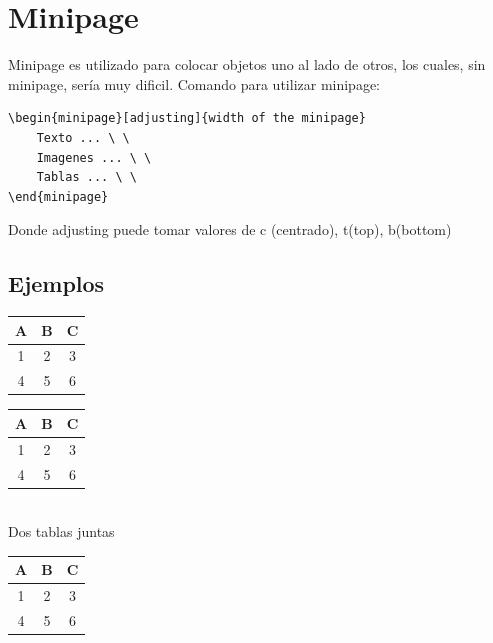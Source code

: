 \documentclass[10pt,journal,compsoc]{IEEEtran}
\begin{document}
\section{Minipage}%
Minipage es utilizado para colocar objetos uno al lado de otros, los cuales, sin minipage, ser\'ia muy dificil.
Comando para utilizar minipage:
\begin{lstlisting}
\begin{minipage}[adjusting]{width of the minipage}
    Texto ... \ \
    Imagenes ... \ \
    Tablas ... \ \
\end{minipage}
\end{lstlisting}
	Donde adjusting puede tomar valores de c (centrado), t(top), b(bottom)
\subsection{Ejemplos}
\begin{minipage}{0.2\textwidth}
	\begin{tabular}{|c|c|c|}
		\hline
		A & B & C \\
		\hline
		1 & 2 & 3  \\
		\hline 
		4 & 5 & 6 \\
		\hline
	\end{tabular}
\end{minipage}
\begin{minipage}{0.2\textwidth}
	\begin{tabular}{c|c|c}
		A & B & C \\
		\hline
		1 & 2 & 3  \\
		\hline 
		4 & 5 & 6 \\
	\end{tabular}
\end{minipage}\\
\newline
Dos tablas juntas\\
\begin{minipage}{0.2\textwidth}
	\begin{tabular}{c|c|c}
		A & B & C \\
		\hline
		1 & 2 & 3  \\
		\hline 
		4 & 5 & 6 \\
	\end{tabular}
\end{minipage}
\end{document}
